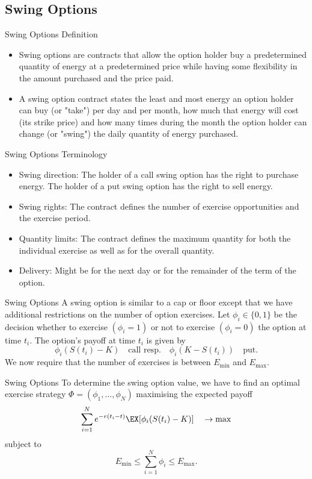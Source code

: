 \subsection{Swing Options}

{Swing Options Definition}
\begin{itemize}
\item<1-> Swing options are contracts that allow the option holder buy a predetermined quantity of energy at a predetermined price while having some flexibility in the amount purchased and the price paid.

\item<2-> A swing option contract states the least and most energy an option holder can buy (or "take") per day and per month, how much that energy will cost (its strike price) and how many times during the month the option holder can change (or "swing") the daily quantity of energy purchased.
\end{itemize}

{Swing Options Terminology}
\begin{itemize}
  \item Swing direction: The holder of a call swing option has the right to purchase energy. The holder of a put swing option has the right to sell energy.
  \item Swing rights: The contract defines the number of exercise opportunities and the exercise period.
  \item Quantity limits: The contract defines the maximum quantity for both the individual exercise as well as for the overall quantity.
  \item Delivery: Might be for the next day or for the remainder of the term of the option.
\end{itemize}

{Swing Options}
A swing option is similar to a cap or floor except that we have
additional restrictions on the number of option exercises. Let
$\phi_i\in\{0,1\}$ be the decision whether to exercise
$(\phi_i=1)$ or not to exercise $(\phi_i=0)$ the option at time
$t_i$. The option's payoff at time $t_i$ is given by
$$\phi_i(S(t_i)-K)\quad\mbox{call resp.}\quad\phi_i(K-S(t_i))\quad\mbox{put}.$$
We now require that the number of exercises is between $E_{\min}$
and $E_{\max}$.

{Swing Options}
To determine the swing option value, we have to find an optimal exercise
strategy $\Phi=(\phi_1,\ldots,\phi_N)$ maximising the expected
payoff
$$\sum_{i=1}^Ne^{-r(t_i-t)}\EX[{\phi_i(S(t_i)-K)}]\quad\rightarrow\max$$
subject to $$E_{\min}\leq\sum_{i=1}^N\phi_i\leq E_{\max}.$$

